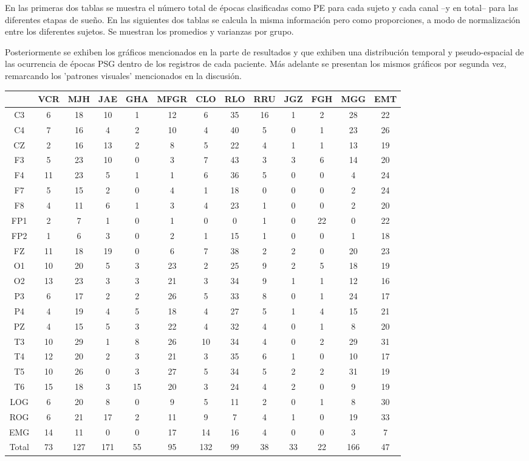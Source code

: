 \documentclass[12pt,a4paper]{mitthesis}
\begin{document}
En las primeras dos tablas se muestra el n\'umero total de \'epocas clasificadas como PE para cada 
sujeto y cada canal --y en total-- para las diferentes etapas de sue\~no. En las siguientes dos 
tablas se calcula la misma informaci\'on pero como proporciones, a modo de normalizaci\'on entre 
los diferentes sujetos. Se muestran los promedios y varianzas por grupo.

Posteriormente se exhiben los gr\'aficos mencionados en la parte de resultados y que exhiben una 
distribuci\'on temporal y pseudo-espacial de las ocurrencia de \'epocas PSG dentro de los registros 
de cada paciente. M\'as adelante se presentan los mismos gr\'aficos por segunda vez, remarcando los 
'patrones visuales' mencionados en la discusi\'on.


\begin{SidewaysFigure}
\centering
\begin{tabular}{c|ccccc|cccc|ccc}
& VCR & MJH & JAE & GHA & MFGR
& CLO & RLO & RRU & JGZ
& FGH & MGG & EMT \\
\hline
C3&6&18&10&1&12&6&35&16&1&2&28&22 \\
C4&7&16&4&2&10&4&40&5&0&1&23&26 \\
CZ&2&16&13&2&8&5&22&4&1&1&13&19 \\
F3&5&23&10&0&3&7&43&3&3&6&14&20 \\
F4&11&23&5&1&1&6&36&5&0&0&4&24 \\
F7&5&15&2&0&4&1&18&0&0&0&2&24 \\
F8&4&11&6&1&3&4&23&1&0&0&2&20 \\
FP1&2&7&1&0&1&0&0&1&0&22&0&22 \\
FP2&1&6&3&0&2&1&15&1&0&0&1&18 \\
FZ&11&18&19&0&6&7&38&2&2&0&20&23 \\
O1&10&20&5&3&23&2&25&9&2&5&18&19 \\
O2&13&23&3&3&21&3&34&9&1&1&12&16 \\
P3&6&17&2&2&26&5&33&8&0&1&24&17 \\
P4&4&19&4&5&18&4&27&5&1&4&15&21 \\
PZ&4&15&5&3&22&4&32&4&0&1&8&20 \\
T3&10&29&1&8&26&10&34&4&0&2&29&31 \\
T4&12&20&2&3&21&3&35&6&1&0&10&17 \\
T5&10&26&0&3&27&5&34&5&2&2&31&19 \\
T6&15&18&3&15&20&3&24&4&2&0&9&19 \\
LOG&6&20&8&0&9&5&11&2&0&1&8&30 \\
ROG&6&21&17&2&11&9&7&4&1&0&19&33 \\
EMG&14&11&0&0&17&14&16&4&0&0&3&7 \\
\hline
Total&73&127&171&55&95&132&99&38&33&22&166&47
\end{tabular}
\caption{Total de \'epocas PE clasificadas como sue\~no MOR 
(fase R) para cada
canal. %
}
\label{total_gpos_mor}
\end{SidewaysFigure}
\end{document}
